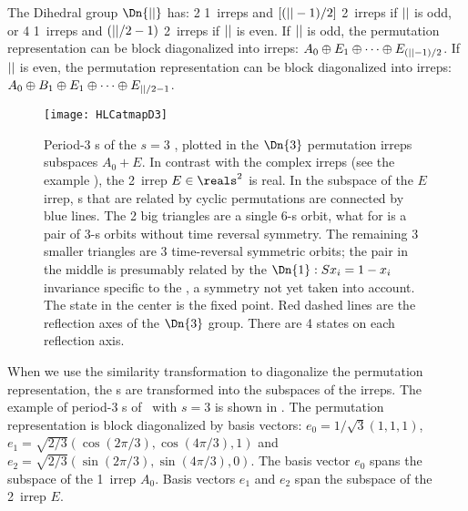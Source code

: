 The Dihedral group $\Dn{\cl{}}$ has: 2 1\dmn\ irreps and $[({||}-1)/2]$
2\dmn\ irreps if ${||}$ is odd,
or 4 1\dmn\ irreps and $({||}/2-1)$ 2\dmn\ irreps if ${||}$ is even.
If ${||}$ is odd, the permutation representation can be block diagonalized into irreps:
$A_0 \oplus E_1 \oplus \dots \oplus E_{({||}-1)/2}$.
If ${||}$ is even, the permutation representation can be block diagonalized into irreps:
$A_0 \oplus B_1 \oplus E_1 \oplus \dots \oplus E_{{||}/2-1}$.

\begin{figure}
  \centering
\texttt{[image: HLCatmapD3]}
  \caption{\label{fig:HLCatmapD3}
Period-3 {\lattstate}s of the $s=3$ \templatt, plotted in the $\Dn{3}$
permutation irreps subspaces $A_0+E$. In contrast with the
\Cn{\cl{}} complex irreps (see the  example
), the 2\dmn\ irrep $E\in\reals^2$ is real.
In the subspace of the $E$ irrep, 
{\lattstate}s that are related by cyclic permutations are connected by blue lines.
The 2 big triangles are a single  6-{\lattstate}s orbit, what for
 is a pair of 3-{\lattstate}s orbits without time reversal symmetry.
The remaining 3 smaller triangles are 3 time-reversal symmetric orbits;
the pair in the middle is presumably related by the
 $\Dn{1}: S\ssp_i = 1-\ssp_i$ invariance specific to
the \templatt, a symmetry not yet taken into account. The state in
the center is the fixed point.
Red dashed lines are the reflection axes of the $\Dn{3}$ group. There are 4 states
on each reflection axis.
}
\end{figure}

When we use the similarity transformation to diagonalize the permutation representation,
the {\lattstate}s are transformed into the subspaces of the irreps.
The example of period-3 {\lattstate}s of \templatt\ with $s=3$ is shown in
. The permutation
representation is block diagonalized by basis vectors: $e_0=1/\sqrt{3}(1,1,1)$,
$e_1=\sqrt{2/3}(\cos(2\pi/3),\cos(4\pi/3),1)$ and $e_2=\sqrt{2/3}(\sin(2\pi/3),\sin(4\pi/3),0)$.
The basis vector $e_0$ spans the subspace of the 1\dmn\ irrep $A_0$.
Basis vectors $e_1$ and $e_2$ span the subspace of the 2\dmn\ irrep $E$.

